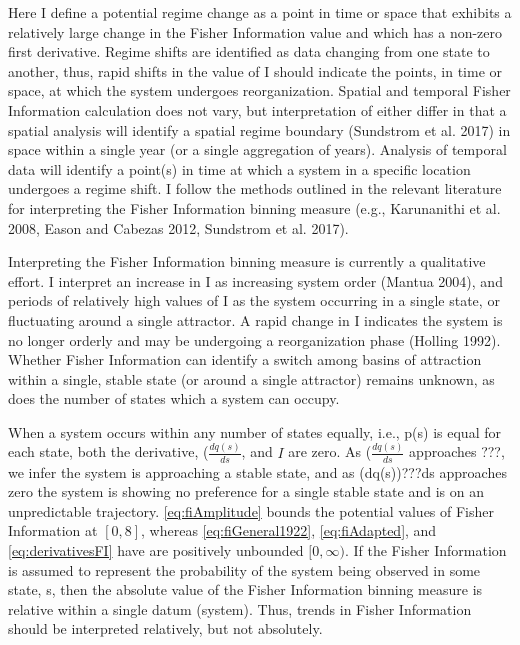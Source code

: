 \documentclass[12pt,twoside,openany]{reedthesis}
\begin{document}
Here I define a potential regime change as a point in time or space that
exhibits a relatively large change in the Fisher Information value and
which has a non-zero first derivative. Regime shifts are identified as
data changing from one state to another, thus, rapid shifts in the value
of I should indicate the points, in time or space, at which the system
undergoes reorganization. Spatial and temporal Fisher Information
calculation does not vary, but interpretation of either differ in that a
spatial analysis will identify a spatial regime boundary (Sundstrom et
al. 2017) in space within a single year (or a single aggregation of
years). Analysis of temporal data will identify a point(s) in time at
which a system in a specific location undergoes a regime shift. I follow
the methods outlined in the relevant literature for interpreting the
Fisher Information binning measure (e.g., Karunanithi et al. 2008, Eason
and Cabezas 2012, Sundstrom et al. 2017).

Interpreting the Fisher Information binning measure is currently a
qualitative effort. I interpret an increase in I as increasing system
order (Mantua 2004), and periods of relatively high values of I as the
system occurring in a single state, or fluctuating around a single
attractor. A rapid change in I indicates the system is no longer orderly
and may be undergoing a reorganization phase (Holling 1992). Whether
Fisher Information can identify a switch among basins of attraction
within a single, stable state (or around a single attractor) remains
unknown, as does the number of states which a system can occupy.

When a system occurs within any number of states equally, i.e., p(s) is
equal for each state, both the derivative, (\(\frac{dq(s)}{ds}\), and
\(I\) are zero. As (\(\frac{dq(s)}{ds}\) approaches ???, we infer the
system is approaching a stable state, and as (dq(s))???ds approaches
zero the system is showing no preference for a single stable state and
is on an unpredictable trajectory. \eqref{eq:fiAmplitude} bounds the
potential values of Fisher Information at \([0, 8]\), whereas
\eqref{eq:fiGeneral1922}, \eqref{eq:fiAdapted}, and \eqref{eq:derivativesFI}
have are positively unbounded \([0, \infty)\). If the Fisher Information
is assumed to represent the probability of the system being observed in
some state, s, then the absolute value of the Fisher Information binning
measure is relative within a single datum (system). Thus, trends in
Fisher Information should be interpreted relatively, but not absolutely.
\end{document}
